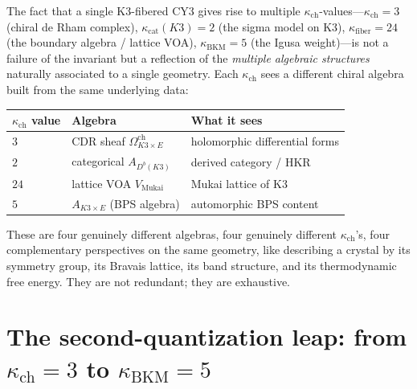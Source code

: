 \documentclass[11pt]{article}
\begin{document}
\begin{remark}
\label{rem:kappa-polysemy}
The fact that a single K3-fibered CY3 gives rise to multiple $\kappa_{\mathrm{ch}}$-values---$\kappa_{\mathrm{ch}} = 3$ (chiral de Rham complex), $\kappa_{\mathrm{cat}}(K3) = 2$ (the sigma model on K3), $\kappa_{\mathrm{fiber}} = 24$ (the boundary algebra / lattice VOA), $\kappa_{\mathrm{BKM}} = 5$ (the Igusa weight)---is not a failure of the invariant but a reflection of the \emph{multiple algebraic structures} naturally associated to a single geometry. Each $\kappa_{\mathrm{ch}}$ sees a different chiral algebra built from the same underlying data:
\begin{center}
\renewcommand{\arraystretch}{1.2}
\begin{tabular}{lll}
 \toprule
 $\kappa_{\mathrm{ch}}$ value & Algebra & What it sees \\
 \midrule
 $3$ & CDR sheaf $\Omega^{\mathrm{ch}}_{K3 \times E}$ & holomorphic differential forms \\
 $2$ & categorical $A_{D^b(K3)}$ & derived category / HKR \\
 $24$ & lattice VOA $V_{\mathrm{Mukai}}$ & Mukai lattice of K3 \\
 $5$ & $A_{K3 \times E}$ (BPS algebra) & automorphic BPS content \\
 \bottomrule
\end{tabular}
\end{center}
These are four genuinely different algebras, four genuinely different $\kappa_{\mathrm{ch}}$'s, four complementary perspectives on the same geometry, like describing a crystal by its symmetry group, its Bravais lattice, its band structure, and its thermodynamic free energy. They are not redundant; they are exhaustive.
\end{remark}


\section{The second-quantization leap: from $\kappa_{\mathrm{ch}} = 3$ to $\kappa_{\mathrm{BKM}} = 5$}
\label{sec:motivic-second-quantization}
\end{document}
